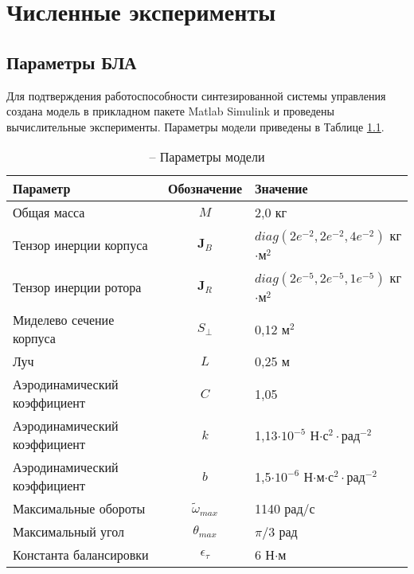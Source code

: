 \chapter{Численные эксперименты}
\section{Параметры БЛА}
Для подтверждения работоспособности синтезированной системы управления создана модель в прикладном пакете Matlab Simulink и проведены вычислительные эксперименты. Параметры модели приведены в Таблице \ref{tb:params_table}.
\begin{table}[h!]
	\centering
	\caption{ -- Параметры модели}\label{tb:params_table} 
	\begin{tabular}{lcl}
		\hline
		Параметр & Обозначение & Значение  \\\hline
		Общая масса & $M$ & 2,0 кг  \\
		Тензор инерции корпуса & $\bm J_B$ & $diag(2e^{-2}, 2e^{-2}, 4e^{-2})$ кг$\cdot$м$^2$  \\
		Тензор инерции ротора & $\bm J_R$ & $diag(2e^{-5}, 2e^{-5}, 1e^{-5})$ кг$\cdot$м$^2$  \\
		Миделево сечение корпуса & $S_{\perp}$ & 0,12 м$^2$ \\
		Луч & $L$ & 0,25 м \\
		Аэродинамический коэффициент & $C$ & 1,05\\
		Аэродинамический коэффициент & $k$ & 1,13$\cdot 10^{-5}$ Н$\cdot$с$^2\cdot$рад$^{-2}$ \\		
		Аэродинамический коэффициент & $b$ & 1,5$\cdot 10^{-6}$ Н$\cdot$м$\cdot$с$^2\cdot$рад$^{-2}$ \\		
		Максимальные обороты & $\tilde \omega_{max}$ & 1140 рад/с \\		
		Максимальный угол & $\theta_{max}$ & ${\pi}/{3}$ рад \\
		Константа балансировки & $\epsilon_\tau$ &6 Н$\cdot$м \\
		\hline
	\end{tabular}
\end{table}

